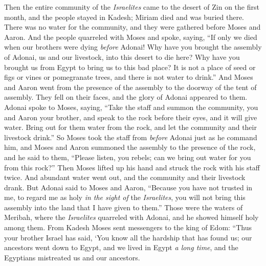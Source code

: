 \begin{biblechapter} %
 Then the entire community of the \textit{Israelites} came to the desert of Zin on the first month, and the people stayed in Kadesh; Miriam died and was buried there.
\verse There was no water for the community, and they were gathered before Moses and Aaron.
\verse And the people quarreled with Moses and spoke, saying, “If only we died when our brothers were dying \textit{before} Adonai!
\verse Why have you brought the assembly of Adonai, us and our livestock, into this desert to die here?
\verse Why have you brought us from Egypt to bring us to this bad place? It is not a place of seed or figs or vines or pomegranate trees, and there is not water to drink.”
\verse And Moses and Aaron went from the presence of the assembly to the doorway of the tent of assembly. They fell on their faces, and the glory of Adonai appeared to them.
\verse Adonai spoke to Moses, saying,
\verse “Take the staff and summon the community, you and Aaron your brother, and speak to the rock before their eyes, and it will give water. Bring out for them water from the rock, and let the community and their livestock drink.”
\verse So Moses took the staff from \textit{before} Adonai just as he command him,
\verse and Moses and Aaron summoned the assembly to the presence of the rock, and he said to them, “Please listen, you rebels; can we bring out water for you from this rock?”
\verse Then Moses lifted up his hand and struck the rock with his staff twice. And abundant water went out, and the community and their livestock drank.
\verse But Adonai said to Moses and Aaron, “Because you have not trusted in me, to regard me as holy \textit{in the sight of} the \textit{Israelites}, you will not bring this assembly into the land that I have given to them.”
\verse Those were the waters of Meribah, where the \textit{Israelites} quarreled with Adonai, and he showed himself holy among them.
\verse From Kadesh Moses sent messengers to the king of Edom: “Thus your brother Israel has said, ‘You know all the hardship that has found us;
\verse our ancestors went down to Egypt, and we lived in Egypt \textit{a long time}, and the Egyptians mistreated us and our ancestors.

\end{biblechapter}

